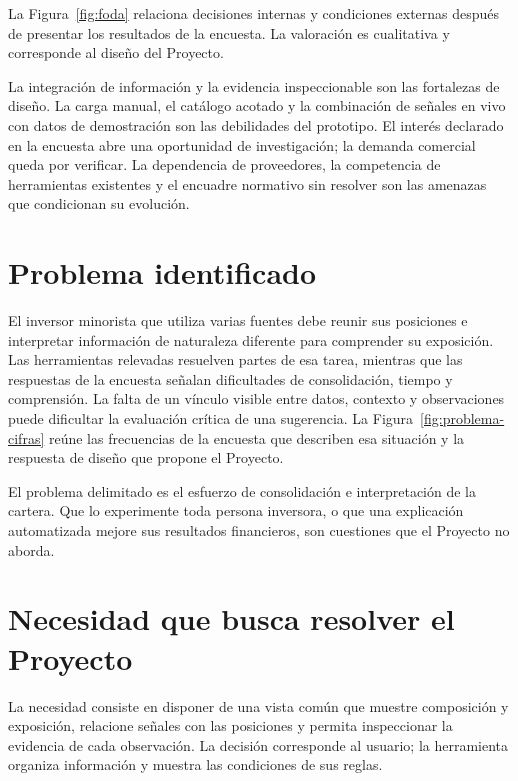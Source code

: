 La Figura~\ref{fig:foda} relaciona decisiones internas y condiciones externas después de presentar los resultados de la encuesta. La valoración es cualitativa y corresponde al diseño del Proyecto.


La integración de información y la evidencia inspeccionable son las fortalezas de diseño. La carga manual, el catálogo acotado y la combinación de señales en vivo con datos de demostración son las debilidades del prototipo. El interés declarado en la encuesta abre una oportunidad de investigación; la demanda comercial queda por verificar. La dependencia de proveedores, la competencia de herramientas existentes y el encuadre normativo sin resolver son las amenazas que condicionan su evolución.

\section{Problema identificado}\label{sec:problema-identificado}

El inversor minorista que utiliza varias fuentes debe reunir sus posiciones e interpretar información de naturaleza diferente para comprender su exposición. Las herramientas relevadas resuelven partes de esa tarea, mientras que las respuestas de la encuesta señalan dificultades de consolidación, tiempo y comprensión. La falta de un vínculo visible entre datos, contexto y observaciones puede dificultar la evaluación crítica de una sugerencia. La Figura~\ref{fig:problema-cifras} reúne las frecuencias de la encuesta que describen esa situación y la respuesta de diseño que propone el Proyecto.


El problema delimitado es el esfuerzo de consolidación e interpretación de la cartera. Que lo experimente toda persona inversora, o que una explicación automatizada mejore sus resultados financieros, son cuestiones que el Proyecto no aborda.

\section{Necesidad que busca resolver el Proyecto}\label{sec:necesidad}

La necesidad consiste en disponer de una vista común que muestre composición y exposición, relacione señales con las posiciones y permita inspeccionar la evidencia de cada observación. La decisión corresponde al usuario; la herramienta organiza información y muestra las condiciones de sus reglas.

